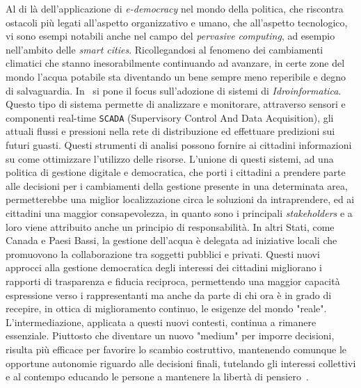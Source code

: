 \documentclass[12pt,a4paper,openright,twoside]{book}
\begin{document}
Al di là dell'applicazione di \textit{e-democracy} nel mondo della politica, che riscontra
ostacoli più legati all'aspetto organizzativo e umano, che all'aspetto tecnologico,
vi sono esempi notabili anche nel campo del \textit{pervasive computing}, ad esempio nell'ambito delle \textit{smart cities}.
Ricollegandosi al fenomeno dei cambiamenti climatici che stanno inesorabilmente continuando ad avanzare,
in certe zone del mondo l'acqua potabile sta diventando un bene sempre meno reperibile e degno di salvaguardia.
In~\cite{smartwater} si pone il focus sull'adozione di sistemi di \textit{Idroinformatica}. Questo tipo di sistema permette di analizzare 
e monitorare, attraverso sensori e componenti real-time \texttt{SCADA} (Supervisory Control And Data Acquisition), gli attuali flussi e pressioni nella
rete di distribuzione ed effettuare predizioni sui futuri guasti. Questi strumenti di analisi possono fornire ai cittadini
informazioni su come ottimizzare l'utilizzo delle risorse. L'unione di questi sistemi, ad una politica di gestione digitale e democratica,
che porti i cittadini a prendere parte alle decisioni per i cambiamenti della gestione presente in una determinata area,
permetterebbe una miglior localizzazione circa le soluzioni da intraprendere, ed ai cittadini una maggior consapevolezza, in quanto sono i principali \textit{stakeholders} 
e a loro viene attribuito anche un principio di responsabilità.
In altri Stati, come Canada e Paesi Bassi, la gestione dell'acqua è delegata ad iniziative locali che promuovono la collaborazione tra soggetti pubblici e privati.
Questi nuovi approcci alla gestione democratica degli interessi dei cittadini migliorano i rapporti di trasparenza e fiducia reciproca, permettendo una maggior capacità espressione
verso i rappresentanti ma anche da parte di chi ora è in grado di recepire, in ottica di miglioramento continuo,
le esigenze del mondo "reale". 
L'intermediazione, applicata a questi nuovi contesti, continua a rimanere essenziale.
Piuttosto che diventare un nuovo "medium" per imporre decisioni, risulta più efficace per
favorire lo scambio costruttivo, mantenendo comunque le opportune autonomie riguardo alle
decisioni finali, tutelando gli interessi collettivi e al contempo educando le persone a mantenere
la libertà di pensiero~\cite{castelfranchi2019problematic}.



\end{document}
